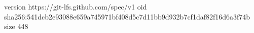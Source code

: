 version https://git-lfs.github.com/spec/v1
oid sha256:541dcb2e93088e659a745971bf408d5c7d11bb9d932b7cf1daf82f16d6a3f74b
size 448
